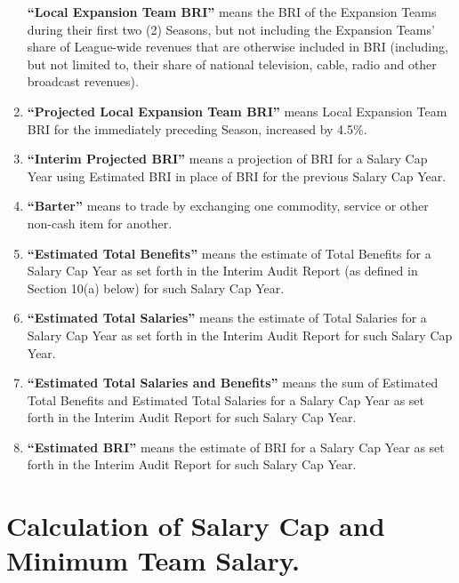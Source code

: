 \documentclass[
]{book}
\begin{document}
\begin{enumerate}
  \textbf{``Local Expansion Team BRI''} means the BRI of the Expansion Teams during their first two (2) Seasons, but not including the Expansion Teams' share of League-wide revenues that are otherwise included in BRI (including, but not limited to, their share of national television, cable, radio and other broadcast revenues).
\item
  \textbf{``Projected Local Expansion Team BRI''} means Local Expansion Team BRI for the immediately preceding Season, increased by 4.5\%.
\item
  \textbf{``Interim Projected BRI''} means a projection of BRI for a Salary Cap Year using Estimated BRI in place of BRI for the previous Salary Cap Year.
\item
  \textbf{``Barter''} means to trade by exchanging one commodity, service or other non-cash item for another.
\item
  \textbf{``Estimated Total Benefits''} means the estimate of Total Benefits for a Salary Cap Year as set forth in the Interim Audit Report (as defined in Section 10(a) below) for such Salary Cap Year.
\item
  \textbf{``Estimated Total Salaries''} means the estimate of Total Salaries for a Salary Cap Year as set forth in the Interim Audit Report for such Salary Cap Year.
\item
  \textbf{``Estimated Total Salaries and Benefits''} means the sum of Estimated Total Benefits and Estimated Total Salaries for a Salary Cap Year as set forth in the Interim Audit Report for such Salary Cap Year.
\item
  \textbf{``Estimated BRI''} means the estimate of BRI for a Salary Cap Year as set forth in the Interim Audit Report for such Salary Cap Year.
\end{enumerate}

\hypertarget{calculation-of-salary-cap-and-minimum-team-salary.}{%
\section{Calculation of Salary Cap and Minimum Team Salary.}\label{calculation-of-salary-cap-and-minimum-team-salary.}}
\end{document}
